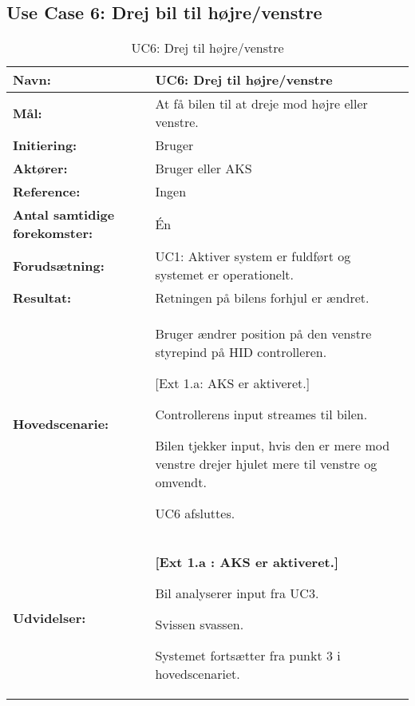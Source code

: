 \subsection{Use Case 6: Drej bil til højre/venstre}
\begin{table}[h]
\begin{tabularx}{\textwidth}{| L{3.3 cm} | Z |} \hline

\textbf{Navn:} 						& UC6: Drej til højre/venstre\\ \hline
\textbf{Mål:}						& At få bilen til at dreje mod højre eller venstre. \\ \hline
\textbf{Initiering:}				& Bruger \\ \hline
\textbf{Aktører:} 					& Bruger eller AKS \\ \hline
\textbf{Reference:} 				& Ingen\\ \hline
\textbf{Antal samtidige forekomster:} & Én \\ \hline
\textbf{Forudsætning:} 				& UC1: Aktiver system er fuldført og systemet er operationelt. \\ \hline
\textbf{Resultat:}					& Retningen på bilens forhjul er ændret. \\ \hline
\textbf{Hovedscenarie:}				& 

\begin{packed_enum}
\item Bruger ændrer position på den venstre styrepind på HID controlleren.
	\begin{packed_item}\itemsep1pt \parskip0pt 
	\item {[}Ext 1.a: AKS er aktiveret.{]}
	\end{packed_item}
\item Controllerens input streames til bilen.
\item Bilen tjekker input, hvis den er mere mod venstre drejer hjulet mere til venstre og omvendt. %
\item UC6 afsluttes.
\end{packed_enum} \\ \hline
\textbf{Udvidelser:}				&  
\textbf{{[}Ext 1.a : AKS er aktiveret.{]}}
	\begin{packed_enum}\itemsep1pt \parskip0pt 
		\item Bil analyserer input fra UC3.
		\item Svissen svassen.
		\item Systemet fortsætter fra punkt 3 i hovedscenariet.
	\end{packed_enum}
\\ \hline
\end{tabularx}
\caption{UC6: Drej til højre/venstre}
\label{tbl:UC6}
\end{table}